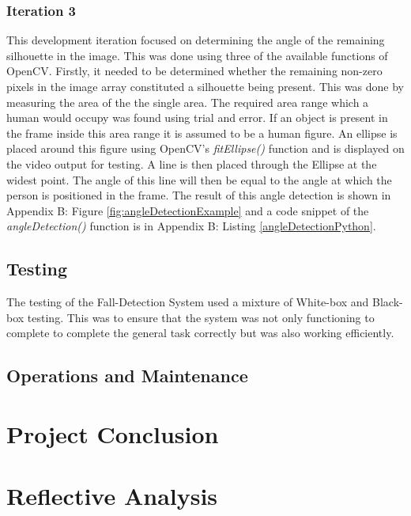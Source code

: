 \documentclass[11pt,a4paper]{report}
\begin{document}
\subsection{Iteration 3}

This development iteration focused on determining the angle of the remaining silhouette in the image. This was done using three of the available functions of OpenCV. Firstly, it needed to be determined whether the remaining non-zero pixels in the image array constituted a silhouette being present. This was done by measuring the area of the the single area. The required area range which a human would occupy was found using trial and error. If an object is present in the frame inside this area range it is assumed to be a human figure. An ellipse is placed around this figure using OpenCV's \textit{fitEllipse()} function and is displayed on the video output for testing. A line is then placed through the Ellipse at the widest point. The angle of this line will then be equal to the angle at which the person is positioned in the frame. The result of this angle detection is shown in Appendix B: Figure \ref{fig:angleDetectionExample} and a code snippet of the \textit{angleDetection()} function is in Appendix B: Listing \ref{angleDetectionPython}.

\pagebreak
\section{Testing}
The testing of the Fall-Detection System used a mixture of White-box and Black-box testing. This was to ensure that the system was not only functioning to complete to complete the general task correctly but was also working efficiently.

\section{Operations and Maintenance}

\chapter{Project Conclusion}

\chapter{Reflective Analysis}

\renewcommand\bibname{References}

\pagebreak
\clearpage
\end{document}
